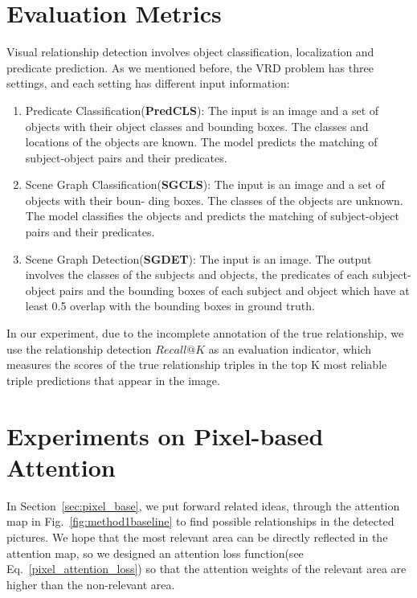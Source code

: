 \section{Evaluation Metrics}


Visual relationship detection involves object classification, localization and predicate prediction. As we mentioned before, the VRD problem has three settings, and each setting has different input information:

\begin{enumerate}[\qquad  $\bullet$]
\item Predicate Classification(\textbf{PredCLS}): The input is an image and a set of objects with their object classes and bounding boxes. The classes and locations of the objects are known. The model predicts the matching of subject-object pairs and their predicates.

\item Scene Graph Classification(\textbf{SGCLS}): The input is an image and a set of objects with their boun- ding boxes. The classes of the objects are unknown. The model classifies the objects and predicts the matching of subject-object pairs and their predicates.

\item Scene Graph Detection(\textbf{SGDET}): The input is an image. The output involves the classes of the subjects and objects, the predicates of each subject-object pairs and the bounding boxes of each subject and object which have at least 0.5 overlap with the bounding boxes in ground truth.
\end{enumerate}

In our experiment, due to the incomplete annotation of the true relationship, we use the relationship detection $ Recall@K $ as an evaluation indicator, which measures the scores of the true relationship triples in the top K most reliable triple predictions that appear in the image.


\label{sec:experimentpixel}
\section{Experiments on Pixel-based Attention}
In Section~\ref{sec:pixel_base}, we put forward related ideas, through the attention map in Fig.~\ref{fig:method1baseline} to find possible relationships in the detected pictures. We hope that the most relevant area can be directly reflected in the attention map, so we designed an attention loss function(see Eq.~\ref{pixel_attention_loss}) so that the attention weights of the relevant area are higher than the non-relevant area.

